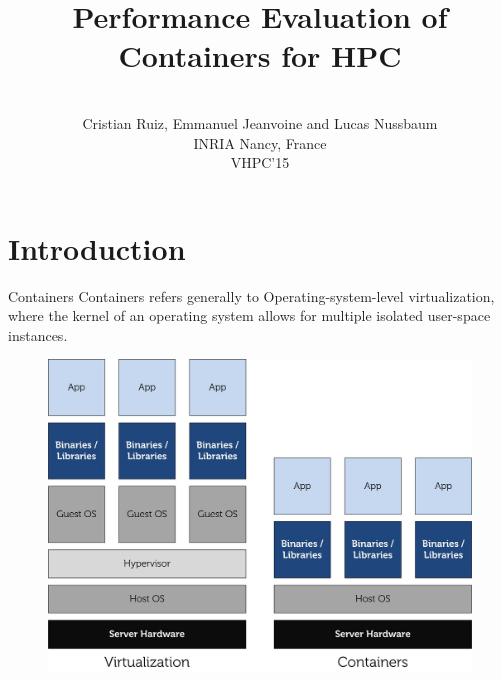 \documentclass[presentation]{beamer}
\author{\\ \vspace{0.5cm} Cristian Ruiz, Emmanuel Jeanvoine and Lucas Nussbaum \\ \vspace{0.5cm} INRIA Nancy, France \\ \vspace{0.5cm} VHPC'15}
\date{}
\title{Performance Evaluation of Containers for HPC}
\begin{document}
\sloppy
{}

\tableofcontents



\section{Introduction}
\label{sec-1}

\begin{frame}[label=sec-1-1]{Containers}
\alert{Containers} refers generally to \alert{Operating-system-level virtualization},
 where the \alert{kernel} of an operating system allows for multiple isolated \alert{user-space instances}.

\begin{figure}[!h]
  \center
  \includegraphics[scale=0.65]{figures/lxc-vm.jpg}
  \label{fig:hpc}
\end{figure}
\end{frame}
\end{document}
